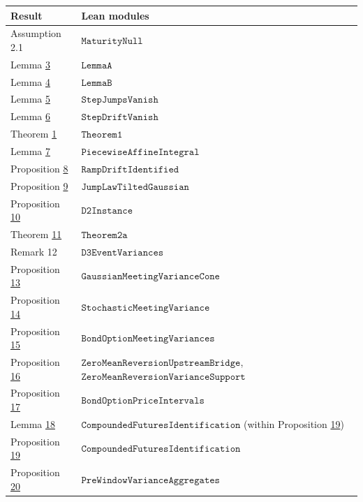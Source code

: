 \documentclass[11pt]{article}
\begin{document}
{\footnotesize\setlength{\tabcolsep}{4pt}
\begin{longtable}{lP{384pt}}
\toprule
\textbf{Result} & \textbf{Lean modules} \\
\midrule
\endhead
\bottomrule
\endlastfoot
Assumption 2.1 & \(\texttt{MaturityNull}\) \\
Lemma \hyperref[res:Lemma-3]{3} & \(\texttt{LemmaA}\) \\
Lemma \hyperref[res:Lemma-4]{4} & \(\texttt{LemmaB}\) \\
Lemma \hyperref[res:Lemma-5]{5} & \(\texttt{StepJumpsVanish}\) \\
Lemma \hyperref[res:Lemma-6]{6} & \(\texttt{StepDriftVanish}\) \\
Theorem \hyperref[res:Theorem-1]{1} & \(\texttt{Theorem1}\) \\
Lemma \hyperref[res:Lemma-7]{7} & \(\texttt{PiecewiseAffineIntegral}\) \\
Proposition \hyperref[res:Proposition-8]{8} & \(\texttt{RampDriftIdentified}\) \\
Proposition \hyperref[res:Proposition-9]{9} & \(\texttt{JumpLawTiltedGaussian}\) \\
Proposition \hyperref[res:Proposition-10]{10} & \(\texttt{D2Instance}\) \\
Theorem \hyperref[res:Theorem-11]{11} & \(\texttt{Theorem2a}\) \\
Remark 12 & \(\texttt{D3EventVariances}\) \\
Proposition \hyperref[res:Proposition-13]{13} & \(\texttt{GaussianMeetingVarianceCone}\) \\
Proposition \hyperref[res:Proposition-14]{14} & \(\texttt{StochasticMeetingVariance}\) \\
Proposition \hyperref[res:Proposition-15]{15} & \(\texttt{BondOptionMeetingVariances}\) \\
Proposition \hyperref[res:Proposition-16]{16} & \(\texttt{ZeroMeanReversionUpstreamBridge}\), \(\texttt{ZeroMeanReversionVarianceSupport}\) \\
Proposition \hyperref[res:Proposition-17]{17} & \(\texttt{BondOptionPriceIntervals}\) \\
Lemma \hyperref[res:Lemma-18]{18} & \(\texttt{CompoundedFuturesIdentification}\) (within Proposition \hyperref[res:Proposition-19]{19}) \\
Proposition \hyperref[res:Proposition-19]{19} & \(\texttt{CompoundedFuturesIdentification}\) \\
Proposition \hyperref[res:Proposition-20]{20} & \(\texttt{PreWindowVarianceAggregates}\) \\

\end{longtable}}
\end{document}
